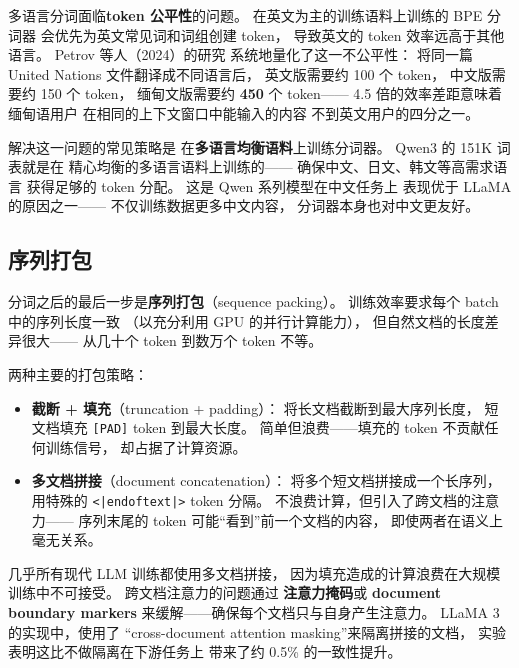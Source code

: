 多语言分词面临\textbf{token 公平性}的问题。
在英文为主的训练语料上训练的 BPE 分词器
会优先为英文常见词和词组创建 token，
导致英文的 token 效率远高于其他语言。
Petrov 等人（2024）的研究%
系统地量化了这一不公平性：
将同一篇 United Nations 文件翻译成不同语言后，
英文版需要约 100 个 token，
中文版需要约 150 个 token，
缅甸文版需要约 \textbf{450} 个 token——
4.5 倍的效率差距意味着缅甸语用户
在相同的上下文窗口中能输入的内容
不到英文用户的四分之一。

解决这一问题的常见策略是
在\textbf{多语言均衡语料}上训练分词器。
Qwen3 的 151K 词表就是在
精心均衡的多语言语料上训练的——
确保中文、日文、韩文等高需求语言
获得足够的 token 分配。
这是 Qwen 系列模型在中文任务上
表现优于 LLaMA 的原因之一——
不仅训练数据更多中文内容，
分词器本身也对中文更友好。

\subsection{序列打包}

分词之后的最后一步是\textbf{序列打包}（sequence packing）。
训练效率要求每个 batch 中的序列长度一致
（以充分利用 GPU 的并行计算能力），
但自然文档的长度差异很大——
从几十个 token 到数万个 token 不等。

两种主要的打包策略：
\begin{itemize}[noitemsep]
  \item \textbf{截断 + 填充}（truncation + padding）：
        将长文档截断到最大序列长度，
        短文档填充 \texttt{[PAD]} token 到最大长度。
        简单但浪费——填充的 token
        不贡献任何训练信号，
        却占据了计算资源。
  \item \textbf{多文档拼接}（document concatenation）：
        将多个短文档拼接成一个长序列，
        用特殊的 \texttt{<|endoftext|>} token 分隔。
        不浪费计算，但引入了跨文档的注意力——
        序列末尾的 token 可能``看到''前一个文档的内容，
        即使两者在语义上毫无关系。
\end{itemize}

几乎所有现代 LLM 训练都使用多文档拼接，
因为填充造成的计算浪费在大规模训练中不可接受。
跨文档注意力的问题通过
\textbf{注意力掩码}或 \textbf{document boundary markers}
来缓解——确保每个文档只与自身产生注意力。
LLaMA 3 的实现中，使用了
``cross-document attention masking''来隔离拼接的文档，
实验表明这比不做隔离在下游任务上
带来了约 0.5\% 的一致性提升。

